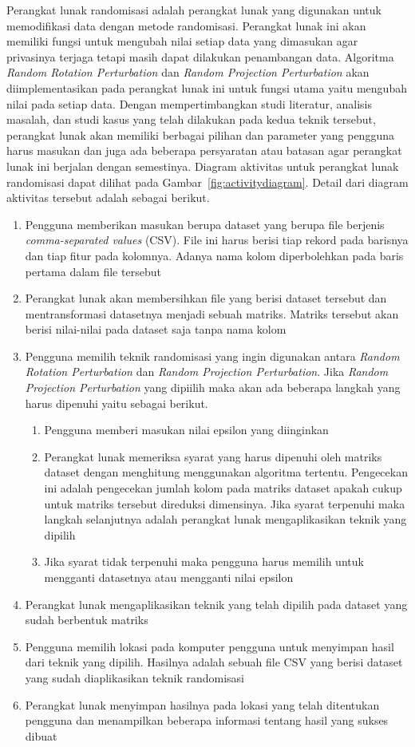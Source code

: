 Perangkat lunak randomisasi adalah perangkat lunak yang digunakan untuk memodifikasi data dengan metode randomisasi. Perangkat lunak ini akan memiliki fungsi untuk mengubah nilai setiap data yang dimasukan agar privasinya terjaga tetapi masih dapat dilakukan penambangan data. Algoritma \textit{Random Rotation Perturbation} dan \textit{Random Projection Perturbation} akan diimplementasikan pada perangkat lunak ini untuk fungsi utama yaitu mengubah nilai pada setiap data. Dengan mempertimbangkan studi literatur, analisis masalah, dan studi kasus yang telah dilakukan pada kedua teknik tersebut, perangkat lunak akan memiliki berbagai pilihan dan parameter yang pengguna harus masukan dan juga ada beberapa persyaratan atau batasan agar perangkat lunak ini berjalan dengan semestinya. Diagram aktivitas untuk perangkat lunak randomisasi dapat dilihat pada Gambar~\ref{fig:activitydiagram}. Detail dari diagram aktivitas tersebut adalah sebagai berikut.
\begin{enumerate}
    \item Pengguna memberikan masukan berupa dataset yang berupa file berjenis \textit{comma-separated values} (CSV). File ini harus berisi tiap rekord pada barisnya dan tiap fitur pada kolomnya. Adanya nama kolom diperbolehkan pada baris pertama dalam file tersebut
    \item Perangkat lunak akan membersihkan file yang berisi dataset tersebut dan mentransformasi datasetnya menjadi sebuah matriks. Matriks tersebut akan berisi nilai-nilai pada dataset saja tanpa nama kolom
    \item Pengguna memilih teknik randomisasi yang ingin digunakan antara \textit{Random Rotation Perturbation} dan \textit{Random Projection Perturbation}. Jika \textit{Random Projection Perturbation} yang dipiilih maka akan ada beberapa langkah yang harus dipenuhi yaitu sebagai berikut.
    \begin{enumerate}
        \item Pengguna memberi masukan nilai epsilon yang diinginkan
        \item Perangkat lunak memeriksa syarat yang harus dipenuhi oleh matriks dataset dengan menghitung menggunakan algoritma tertentu. Pengecekan ini adalah pengecekan jumlah kolom pada matriks dataset apakah cukup untuk matriks tersebut direduksi dimensinya. Jika syarat terpenuhi maka langkah selanjutnya adalah perangkat lunak mengaplikasikan teknik yang dipilih
        \item Jika syarat tidak terpenuhi maka pengguna harus memilih untuk mengganti datasetnya atau mengganti nilai epsilon
    \end{enumerate}
    \item Perangkat lunak mengaplikasikan teknik yang telah dipilih pada dataset yang sudah berbentuk matriks
    \item Pengguna memilih lokasi pada komputer pengguna untuk menyimpan hasil dari teknik yang dipilih. Hasilnya adalah sebuah file CSV yang berisi dataset yang sudah diaplikasikan teknik randomisasi
    \item Perangkat lunak menyimpan hasilnya pada lokasi yang telah ditentukan pengguna dan menampilkan beberapa informasi tentang hasil yang sukses dibuat
\end{enumerate}


